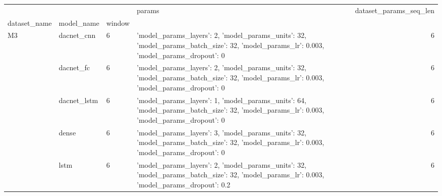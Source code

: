 \begin{tabular}{llllr}
\toprule
 &  &  & params & dataset_params_seq_len \\
dataset_name & model_name & window &  &  \\
\midrule
\multirow[t]{5}{*}{M3} & dacnet_cnn & 6 & {'model_params_layers': 2, 'model_params_units': 32, 'model_params_batch_size': 32, 'model_params_lr': 0.003, 'model_params_dropout': 0} & 6 \\
\cline{2-5}
 & dacnet_fc & 6 & {'model_params_layers': 2, 'model_params_units': 32, 'model_params_batch_size': 32, 'model_params_lr': 0.003, 'model_params_dropout': 0} & 6 \\
\cline{2-5}
 & dacnet_lstm & 6 & {'model_params_layers': 1, 'model_params_units': 64, 'model_params_batch_size': 32, 'model_params_lr': 0.003, 'model_params_dropout': 0} & 6 \\
\cline{2-5}
 & dense & 6 & {'model_params_layers': 3, 'model_params_units': 32, 'model_params_batch_size': 32, 'model_params_lr': 0.003, 'model_params_dropout': 0} & 6 \\
\cline{2-5}
 & lstm & 6 & {'model_params_layers': 2, 'model_params_units': 32, 'model_params_batch_size': 32, 'model_params_lr': 0.003, 'model_params_dropout': 0.2} & 6 \\
\cline{1-5} \cline{2-5}
\bottomrule
\end{tabular}

